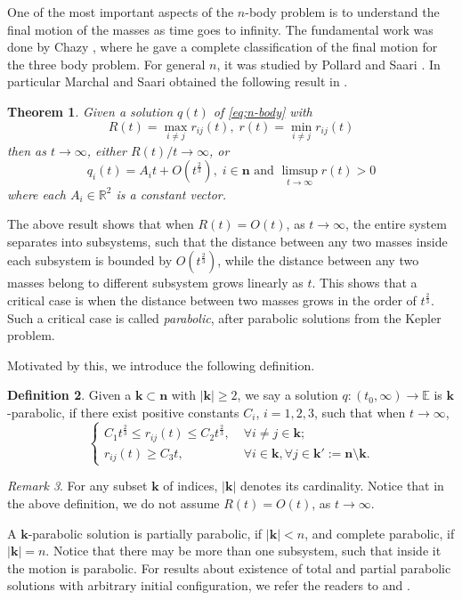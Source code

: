 \documentclass[11pt]{amsart}
\newtheorem{theorem}{Theorem}[section]
\theoremstyle{definition}
\newtheorem{definition}[theorem]{Definition}
\theoremstyle{remark}
\newtheorem{remark}[theorem]{Remark}
\numberwithin{equation}{section}
\newcommand{\rr}{\mathbb R}
\newcommand{\be}{\mathbb E}
\newcommand{\bn}{\mathbf n}
\newcommand{\bk}{\mathbf k}
\newcommand{\se}{\frac{2}{3}}
\begin{document}
One of the most important aspects of the $n$-body problem is to understand the final motion of the masses as time goes to infinity. The fundamental work was done by Chazy \cite{Chazy22}, where he gave a complete classification of the final motion for the three body problem. For general $n$, it was studied by Pollard \cite{Pl67} and Saari \cite{Sr71}. In particular   Marchal and Saari obtained the following result in \cite[Corollary 1]{MS76}. 

\begin{theorem} \label{thm;March-Saari}
Given a solution $q(t)$ of \eqref{eq;n-body} with 
$$ R(t) = \max_{i \ne j} r_{ij}(t), \; r(t) = \min_{ i \ne j } r_{ij}(t)$$
then as $t \to \infty$, either $R(t)/t \to \infty$, or 
$$ q_i(t) = A_i t + O(t^{\se}), \; i \in \bn \text{ and } \limsup_{t \to \infty} r(t) >0 $$
where each $A_i \in \rr^2$ is a constant vector. 
\end{theorem}

The above result shows that when $R(t) = O(t)$, as $t \to \infty$, the entire system separates into subsystems, such that the distance between any two masses inside each subsystem is bounded by $O(t^{\se})$, while the distance between any two masses belong to different subsystem grows linearly as $t$. This shows that a critical case is when the distance between two masses grows in the order of $t^{\se}$. Such a critical case is called \emph{parabolic}, after parabolic solutions from the Kepler problem.

Motivated by this, we introduce the following definition.
\begin{definition}
\label{df;k-para} Given a $\bk \subset \bn$ with $|\bk| \ge 2$, we say a solution $q: (t_0, \infty) \to \be$ is $\bk$-parabolic, if there exist positive constants $C_i$, $i =1, 2, 3$, such that when $t \to \infty$, 
$$ 
\begin{cases}
C_1 t^{\se} \le r_{ij}(t) \le C_2 t^{\se}, & \; \forall i \ne j \in \bk; \\
r_{ij}(t) \ge C_3 t, & \; \forall i \in \bk, \forall j \in \bk':= \bn \setminus \bk.
\end{cases} 
$$
\end{definition}

\begin{remark}
For any subset $\bk$ of indices, $|\bk|$ denotes its cardinality. Notice that in the above definition, we do not assume $R(t) = O(t)$, as $t \to \infty$.
\end{remark}

 A $\bk$-parabolic solution is partially parabolic, if $|\bk| < n$, and complete parabolic, if $|\bk|=n$. Notice that there may be more than one subsystem, such that inside it the motion is parabolic. For results about existence of total and partial parabolic solutions with arbitrary initial configuration, we refer the readers to \cite{MV09} and \cite{PT24}.
\end{document}
